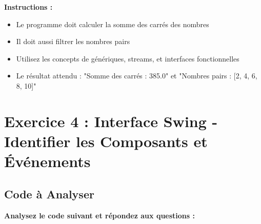 \documentclass[11pt,a4paper]{article}
\begin{document}
\textbf{Instructions :}
\begin{itemize}
    \item Le programme doit calculer la somme des carrés des nombres
    \item Il doit aussi filtrer les nombres pairs
    \item Utilisez les concepts de génériques, streams, et interfaces fonctionnelles
    \item Le résultat attendu : "Somme des carrés : 385.0" et "Nombres pairs : [2, 4, 6, 8, 10]"
\end{itemize}

\newpage

\section{Exercice 4 : Interface Swing - Identifier les Composants et Événements}

\subsection{Code à Analyser}

\textbf{Analysez le code suivant et répondez aux questions :}
\end{document}
